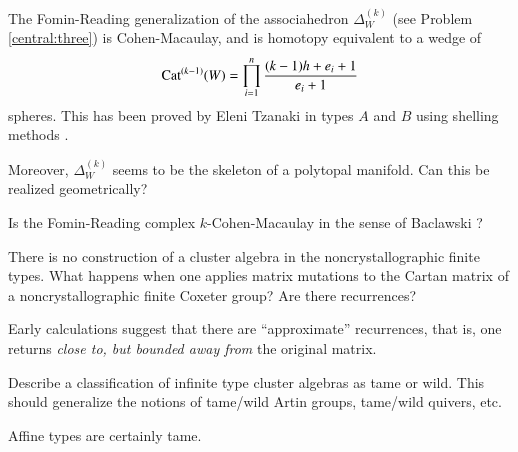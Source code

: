 \documentclass[12pt,letterpaper, reqno]{aimpl}
\newcommand{\Cat}{{\rm Cat}}
\begin{document}
\begin{problemblock} 
\begin{conjecture}[6.3]   The Fomin-Reading generalization of the associahedron $\Delta_W^{(k)}$ (see Problem \ref{central:three}) is Cohen-Macaulay, and is homotopy equivalent to a wedge of 
\begin{equation*}
\Cat^{(k-1)}(W)=\prod_{i=1}^n \frac{(k-1)h +e_i +1}{e_i+1}
\end{equation*}
spheres. This has been proved by Eleni Tzanaki in types $A$ and $B$  using shelling methods \cite{tzanaki}.

Moreover, $\Delta_W^{(k)}$ seems to be the skeleton of a polytopal manifold. Can this be realized geometrically?
\end{conjecture}


\begin{remark} Is the Fomin-Reading complex $k$-Cohen-Macaulay in the sense of Baclawski \cite{baclawski}?\end{remark}

\end{problemblock}

\begin{problemblock}

\begin{problem}[6.4]  
There is no construction of a cluster algebra in the noncrystallographic finite types.
What happens when one applies matrix mutations to the Cartan matrix of a noncrystallographic finite Coxeter group? Are there recurrences?
\end{problem}

\begin{remark} Early calculations suggest that
there are ``approximate'' recurrences, that is, one returns \emph{close to,
but bounded away from} the original matrix.
\end{remark}

\end{problemblock}

\begin{problemblock}
\begin{problem}[6.5]\label{prob:infinitetypes}  Describe a classification of infinite type cluster algebras as tame or wild. This should generalize the notions of tame/wild Artin groups, tame/wild quivers, etc.
\end{problem}

\begin{remark} Affine types are certainly tame. \end{remark}

\end{problemblock}
\end{document}
